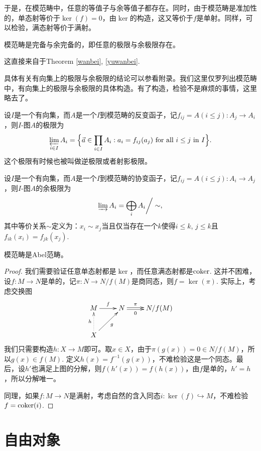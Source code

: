 于是，在模范畴中，任意的等值子与余等值子都存在。同时，由于模范畴是准加性的，单态射等价于$\ker(f)=0$，由$\ker$的构造，这又等价于$f$是单射。同样，可以检验，满态射等价于满射。

\begin{thm}
模范畴是完备与余完备的，即任意的极限与余极限存在。
\end{thm}

这直接来自于Theorem \ref{wanbei}, \ref{yuwanbei}.

\begin{para}[有向集上的极限与余极限]
具体有关有向集上的极限与余极限的结论可以参看附录。我们这里仅罗列出模范畴中，有向集上的极限与余极限的具体构造。有了构造，检验不是麻烦的事情，这里略去了。

设$I$是一个有向集，而$A$是一个$I$到模范畴的反变函子，记$f_{ij}=A(i\leq j):A_j\to A_i$，则$I$-图$A$的极限为
\[
	\varprojlim _{i\in I}A_{i}={\Big \{}{\vec {a}}\in \prod _{i\in I}A_{i}\;{:}\;a_{i}=f_{ij}(a_{j}){\text{ for all }}i\leq j{\text{ in }}I{\Big \}}.
\]
这个极限有时候也被叫做逆极限或者射影极限。

设$I$是一个有向集，而$A$是一个$I$到模范畴的协变函子，记$f_{ij}=A(i\leq j):A_i\to A_j$，则$I$-图$A$的余极限为
\[
	\varinjlim A_{i}=\bigoplus_{i}A_{i}{\bigg /}\sim,
\]
其中等价关系$\sim$定义为：$x_i\sim x_j$当且仅当存在一个$k$使得$i\leq k$, $j\leq k$且$f_{ik}(x_{i})=f_{jk}(x_{j})$.
\end{para}

\begin{thm}
模范畴是Abel范畴。
\end{thm}

\begin{proof}
我们需要验证任意单态射都是$\ker$，而任意满态射都是$\operatorname{coker}$. 这并不困难，设$f:M\to N$是单的，记$\pi:N\to N/f(M)$是商同态，则$f=\ker(\pi)$. 实际上，考虑交换图
\[
\begin{xy}
	\xymatrix{
		M\ar[r]^-{f}&N\ar@<0.3ex>[r]^-{\pi} \ar@<-0.3ex>[r]_-{0}&N/f(M)\\
		X\ar@{.>}[u]^-{h}\ar[ur]_-{g}
	}
\end{xy}
\]
我们只需要构造$h:X\to M$即可。取$x\in X$，由于$\pi (g(x))=0\in N/f(M)$，所以$g(x)\in f(M)$. 定义$h(x)=f^{-1}(g(x))$，不难检验这是一个同态。最后，设$h'$也满足上图的分解，则$f(h'(x))=f(h(x))$，由$f$是单的，$h'=h$，所以分解唯一。

同理，如果$f:M\to N$是满射，考虑自然的含入同态$i:\ker(f)\hookrightarrow M$，不难检验$f=\operatorname{coker}(i)$.
\end{proof}

\section{自由对象}

